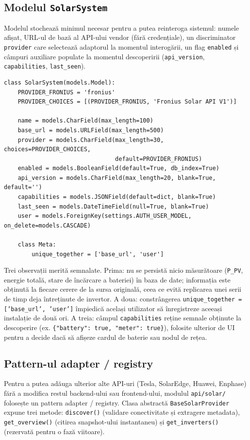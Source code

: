 \subsection{Modelul \texttt{SolarSystem}}
Modelul stochează minimul necesar pentru a putea reinteroga sistemul: numele afișat, URL-ul de bază al API-ului vendor (fără credențiale), un discriminator \texttt{provider} care selectează adaptorul la momentul interogării, un flag \texttt{enabled} și câmpuri auxiliare populate la momentul descoperirii (\texttt{api\_version}, \texttt{capabilities}, \texttt{last\_seen}).

\begin{verbatim}
class SolarSystem(models.Model):
    PROVIDER_FRONIUS = 'fronius'
    PROVIDER_CHOICES = [(PROVIDER_FRONIUS, 'Fronius Solar API V1')]

    name = models.CharField(max_length=100)
    base_url = models.URLField(max_length=500)
    provider = models.CharField(max_length=30, choices=PROVIDER_CHOICES,
                                default=PROVIDER_FRONIUS)
    enabled = models.BooleanField(default=True, db_index=True)
    api_version = models.CharField(max_length=20, blank=True, default='')
    capabilities = models.JSONField(default=dict, blank=True)
    last_seen = models.DateTimeField(null=True, blank=True)
    user = models.ForeignKey(settings.AUTH_USER_MODEL, on_delete=models.CASCADE)

    class Meta:
        unique_together = ['base_url', 'user']
\end{verbatim}

Trei observații merită semnalate. Prima: nu se persistă nicio măsurătoare (\texttt{P\_PV}, energie totală, stare de încărcare a bateriei) în baza de date; informația este obținută la fiecare cerere de la sursa originală, ceea ce evită replicarea unei serii de timp deja întreținute de invertor. A doua: constrângerea \texttt{unique\_together = ['base\_url', 'user']} împiedică același utilizator să înregistreze aceeași instalație de două ori. A treia: câmpul \texttt{capabilities} reține semnale obținute la descoperire (ex. \texttt{\{"battery": true, "meter": true\}}), folosite ulterior de UI pentru a decide dacă să afișeze cardul de baterie sau nodul de rețea.

\subsection{Pattern-ul adapter / registry}
Pentru a putea adăuga ulterior alte API-uri (Tesla, SolarEdge, Huawei, Enphase) fără a modifica restul backend-ului sau frontend-ului, modulul \texttt{api/solar/} folosește un pattern adapter / registry. Clasa abstractă \texttt{BaseSolarProvider} expune trei metode: \texttt{discover()} (validare conectivitate și extragere metadata), \texttt{get\_overview()} (citirea snapshot-ului instantaneu) și \texttt{get\_inverters()} (rezervată pentru o fază viitoare).

